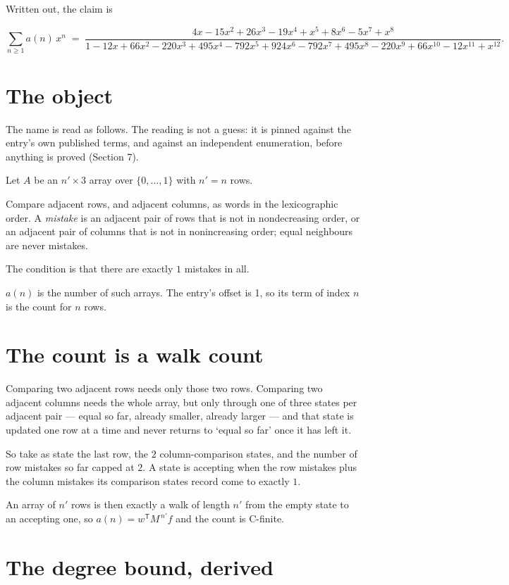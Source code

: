 \documentclass[11pt]{article}
\theoremstyle{definition}
\begin{document}
Written out, the claim is

\[\sum_{n \ge 1} a(n)\,x^n \;=\; \frac{4x - 15x^{2} + 26x^{3} - 19x^{4} + x^{5} + 8x^{6} - 5x^{7} + x^{8}}{1 - 12x + 66x^{2} - 220x^{3} + 495x^{4} - 792x^{5} + 924x^{6} - 792x^{7} + 495x^{8} - 220x^{9} + 66x^{10} - 12x^{11} + x^{12}}.\]

\section{The object}

The name is read as follows. The reading is not a guess: it is pinned against the entry's own published terms, and against an independent enumeration, before anything is proved (Section 7).

Let $A$ be an $n' \times 3$ array over $\{0,\dots,1\}$ with $n' = n$ rows.

Compare adjacent rows, and adjacent columns, as words in the lexicographic order. A {\itshape mistake} is an adjacent pair of rows that is not in nondecreasing order, or an adjacent pair of columns that is not in nonincreasing order; equal neighbours are never mistakes.

The condition is that there are exactly $1$ mistakes in all.

$a(n)$ is the number of such arrays. The entry's offset is 1, so its term of index $n$ is the count for $n$ rows.

\section{The count is a walk count}

Comparing two adjacent rows needs only those two rows. Comparing two adjacent columns needs the whole array, but only through one of three states per adjacent pair --- equal so far, already smaller, already larger --- and that state is updated one row at a time and never returns to `equal so far' once it has left it.

So take as state the last row, the $2$ column-comparison states, and the number of row mistakes so far capped at $2$. A state is accepting when the row mistakes plus the column mistakes its comparison states record come to exactly $1$.

An array of $n'$ rows is then exactly a walk of length $n'$ from the empty state to an accepting one, so $a(n) = w^{\mathsf T}M^{\,n'}f$ and the count is C-finite.

\section{The degree bound, derived}
\end{document}
